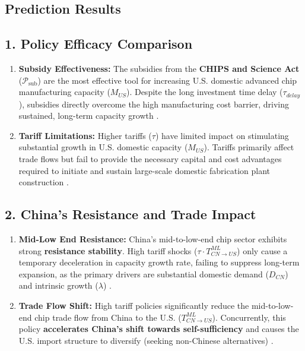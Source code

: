 \documentclass{apmcmthesis}
\begin{document}
\subsection{Prediction Results}
\subsection*{1. Policy Efficacy Comparison}

\begin{enumerate}
    \item \textbf{Subsidy Effectiveness:} The subsidies from the \textbf{CHIPS and Science Act} ($\mathcal{P}_{\text{sub}}$) are the most effective tool for increasing U.S. domestic advanced chip manufacturing capacity ($M_{US}$). Despite the long investment time delay ($\tau_{delay}$), subsidies directly overcome the high manufacturing cost barrier, driving sustained, long-term capacity growth \cite{nist2025chips}.
    \item \textbf{Tariff Limitations:} Higher tariffs ($\tau$) have limited impact on stimulating substantial growth in U.S. domestic capacity ($M_{US}$). Tariffs primarily affect trade flows but fail to provide the necessary capital and cost advantages required to initiate and sustain large-scale domestic fabrication plant construction \cite{piie2025tariff}.
\end{enumerate}

\subsection*{2. China's Resistance and Trade Impact}

\begin{enumerate}
    \item \textbf{Mid-Low End Resistance:} China's mid-to-low-end chip sector exhibits strong \textbf{resistance stability}. High tariff shocks ($\tau \cdot T_{CN \to US}^{ML}$) only cause a temporary deceleration in capacity growth rate, failing to suppress long-term expansion, as the primary drivers are substantial domestic demand ($D_{CN}$) and intrinsic growth ($\lambda$) \cite{semiconductors2025state}.
    \item \textbf{Trade Flow Shift:} High tariff policies significantly reduce the mid-to-low-end chip trade flow from China to the U.S. ($T_{CN \to US}^{ML}$). Concurrently, this policy \textbf{accelerates China's shift towards self-sufficiency} and causes the U.S. import structure to diversify (seeking non-Chinese alternatives) \cite{trademap2025}.
\end{enumerate}
\end{document}
